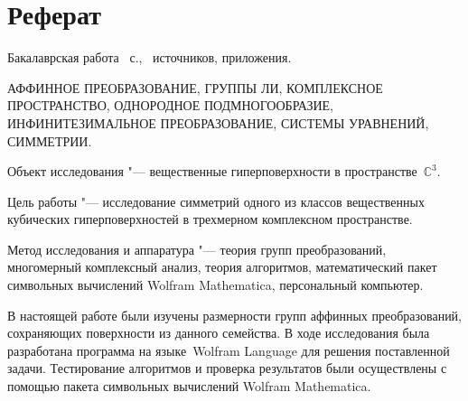 \documentclass[../main.tex]{subfiles}
\begin{document}
\newpage
\section*{\centering Реферат}

\par\noindent Бакалаврская работа ~с., \ источников,  приложения.\\
\vspace{0.5cm}

\par\noindent АФФИННОЕ ПРЕОБРАЗОВАНИЕ, ГРУППЫ ЛИ, КОМПЛЕКСНОЕ ПРОСТРАНСТВО, ОДНОРОДНОЕ ПОДМНОГООБРАЗИЕ, ИНФИНИТЕЗИМАЛЬНОЕ ПРЕОБРАЗОВАНИЕ, СИСТЕМЫ УРАВНЕНИЙ, СИММЕТРИИ.\\

\par\noindent Объект исследования "--- вещественные гиперповерхности в пространстве~$\mathbb{C}^3$.\\
\par\noindent Цель работы "--- исследование симметрий одного из классов вещественных кубических гиперповерхностей в трехмерном комплексном пространстве.\\
\par\noindent Метод исследования и аппаратура "--- теория групп преобразований, многомерный комплексный анализ, теория алгоритмов, математический пакет символьных вычислений {\ttfamily Wolfram Mathematica}, персональный компьютер.\\

\par\noindent В настоящей работе были изучены размерности групп аффинных преобразований, сохраняющих поверхности из данного семейства. В ходе исследования была разработана программа на языке~{\ttfamily Wolfram Language} для решения поставленной задачи. Тестирование алгоритмов и проверка результатов были осуществлены с помощью пакета символьных вычислений {\ttfamily Wolfram Mathematica}.

\clearpage
\normalsize
\end{document}
